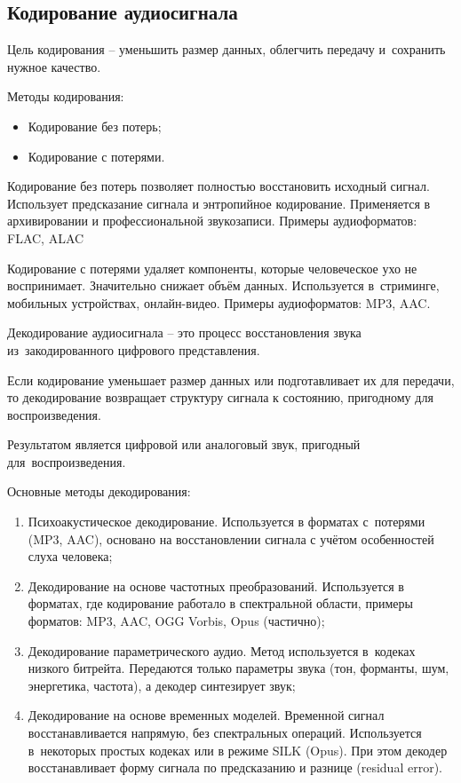 \documentclass{ou}
\begin{document}
\subsection{Кодирование аудиосигнала}
Цель кодирования -- уменьшить размер данных, облегчить передачу и~сохранить нужное качество.

Методы кодирования:
\begin{itemize}[label=-, leftmargin=0em, itemindent=3.35em, nosep]
\item Кодирование без потерь;
\item Кодирование с потерями.
\end{itemize}

Кодирование без потерь позволяет полностью восстановить исходный сигнал. Использует предсказание сигнала и энтропийное кодирование. Применяется в архивировании и профессиональной звукозаписи. Примеры аудиоформатов: FLAC, ALAC

Кодирование с потерями удаляет компоненты, которые человеческое ухо не воспринимает. Значительно снижает объём данных. Используется в~стриминге, мобильных устройствах, онлайн-видео. Примеры аудиоформатов: MP3, AAC.

Декодирование аудиосигнала -- это процесс восстановления звука из~закодированного цифрового представления.

Если кодирование уменьшает размер данных или подготавливает их для передачи, то декодирование возвращает структуру сигнала к состоянию, пригодному для воспроизведения.

Результатом является цифровой или аналоговый звук, пригодный для~воспроизведения.

Основные методы декодирования:
\begin{enumerate}[leftmargin=0em, itemindent=3.75em, nosep, label=\arabic*)]
\item Психоакустическое декодирование. Используется в форматах с~потерями (MP3, AAC), основано на восстановлении сигнала с учётом особенностей слуха человека;
\item Декодирование на основе частотных преобразований. Используется в форматах, где кодирование работало в спектральной области, примеры форматов: MP3, AAC, OGG Vorbis, Opus (частично);
\item Декодирование параметрического аудио. Метод используется в~кодеках низкого битрейта. Передаются только параметры звука (тон, форманты, шум, энергетика, частота), а декодер синтезирует звук;
\item Декодирование на основе временных моделей. Временной сигнал восстанавливается напрямую, без спектральных операций. Используется в~некоторых простых кодеках или в режиме SILK (Opus). При этом декодер восстанавливает форму сигнала по предсказанию и разнице (residual error).
\end{enumerate}
\end{document}
